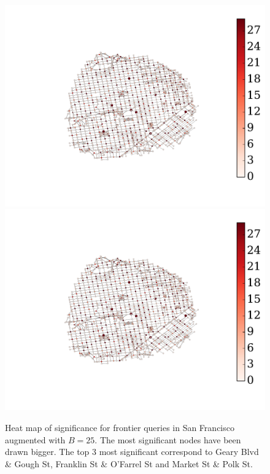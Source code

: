 \begin{figure} 
\begin{center}
\includegraphics[clip, trim=3.7cm 2.9cm 4.2cm 3cm,scale=0.8]{TexImg/sig_colapse.pdf}
\includegraphics[clip, trim=15cm 1.5cm 0.1cm 0.8cm,scale=0.45]{TexImg/sig_colapse.pdf}
\caption{Heat map of significance for frontier queries in San Francisco augmented with $B=25$.
The most significant nodes have been drawn bigger.
The top 3 most significant correspond to Geary Blvd \& Gough St, Franklin St \& O'Farrel St and Market St \& Polk St.}
\label{fig:sig_colapse}
\end{center}
\end{figure}


